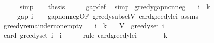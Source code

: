 \begin{isabellebody}
\ \ \ \ \isamarkupfalse%
\ simp\isanewline
\ \ \isamarkupfalse%
\ {\isacharquery}{\kern0pt}thesis\isanewline
\ \ \ \ \isamarkupfalse%
\ gap{\isacharunderscore}{\kern0pt}def\ \isamarkupfalse%
\ simp\isanewline
{}\isamarkupfalse%
%
\endisatagproof
{\isafoldproof}%
%
\isadelimproof
\isanewline
%
\endisadelimproof
\isanewline
{}\isamarkupfalse%
\ greedy{\isacharunderscore}{\kern0pt}gap{\isacharunderscore}{\kern0pt}nonneg{\isacharcolon}{\kern0pt}\isanewline
\ \ \ {\isachardoublequoteopen}i\ {\isasymle}\ k{\isachardoublequoteclose}\isanewline
\ \ \ {\isachardoublequoteopen}{}\ {\isasymle}\ gap\ i{\isachardoublequoteclose}\isanewline
%
\isadelimproof
\ \ %
\endisadelimproof
%
\isatagproof
{}\isamarkupfalse%
\ gap{\isacharunderscore}{\kern0pt}nonneg{\isacharbrackleft}{\kern0pt}OF\ greedy{\isacharunderscore}{\kern0pt}subset{\isacharunderscore}{\kern0pt}V\ card{\isacharunderscore}{\kern0pt}greedy{\isacharunderscore}{\kern0pt}le{\isacharunderscore}{\kern0pt}i\ assms{\isacharbrackright}{\kern0pt}\ \isakeywordONE{{\isachardot}{\kern0pt}}\isamarkupfalse%
%
\endisatagproof
{\isafoldproof}%
%
\isadelimproof
\isanewline
%
\endisadelimproof
\isanewline
{}\isamarkupfalse%
\ greedy{\isacharunderscore}{\kern0pt}remainder{\isacharunderscore}{\kern0pt}nonempty{\isacharcolon}{\kern0pt}\isanewline
\ \ \ {\isachardoublequoteopen}i\ {\isacharless}{\kern0pt}\ k{\isachardoublequoteclose}\isanewline
\ \ \ {\isachardoublequoteopen}V\ {\isacharminus}{\kern0pt}\ greedy{\isacharunderscore}{\kern0pt}set\ i\ {\isasymnoteq}\ {\isacharbraceleft}{\kern0pt}{\isacharbraceright}{\kern0pt}{\isachardoublequoteclose}\isanewline
%
\isadelimproof
%
\endisadelimproof
%
\isatagproof
{}\isamarkupfalse%
\ {\isacharminus}{\kern0pt}\isanewline
\ \ \isamarkupfalse%
\ {\isachardoublequoteopen}card\ {\isacharparenleft}{\kern0pt}greedy{\isacharunderscore}{\kern0pt}set\ i{\isacharparenright}{\kern0pt}\ {\isasymle}\ i{\isachardoublequoteclose}\isanewline
\ \ \ \ \isamarkupfalse%
\ {\isacharparenleft}{\kern0pt}rule\ card{\isacharunderscore}{\kern0pt}greedy{\isacharunderscore}{\kern0pt}le{\isacharunderscore}{\kern0pt}i{\isacharparenright}{\kern0pt}\isanewline
\ \ \isamarkupfalse%
\ \isamarkupfalse%
\ {\isachardoublequoteopen}{\isachardot}{\kern0pt}{\isachardot}{\kern0pt}{\isachardot}{\kern0pt}\ {\isacharless}{\kern0pt}\ k{\isachardoublequoteclose}\isanewline

\end{isabellebody}
